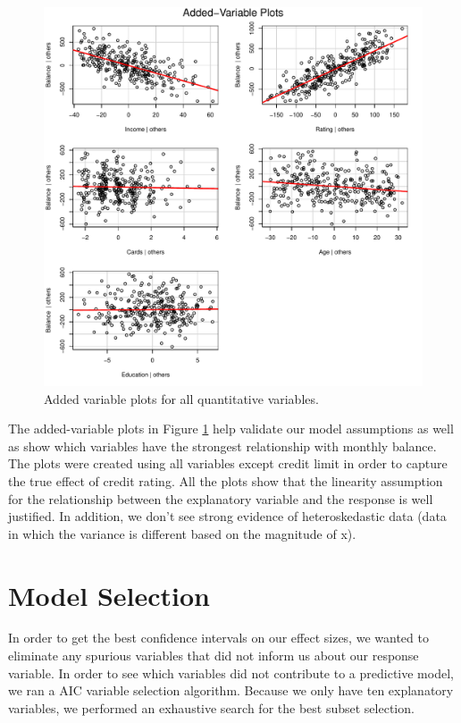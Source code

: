 \documentclass{article}
\begin{document}
\begin{figure}
\centering
\includegraphics[scale=.5]{AVPlot.pdf}
\caption{Added variable plots for all quantitative variables. }
\label{av}
\end{figure}

The added-variable plots in Figure \ref{av} help validate our model assumptions as well as show which variables have the strongest relationship with monthly balance. The plots were created using all variables except credit limit in order to capture the true effect of credit rating. All the plots show that the linearity assumption for the relationship between the explanatory variable and the response is well justified. In addition, we don't see strong evidence of heteroskedastic data (data in which the variance is different based on the magnitude of x).  
\section{Model Selection}
In order to get the best confidence intervals on our effect sizes, we wanted to eliminate any spurious variables that did not inform us about our response variable. In order to see which variables did not contribute to a predictive model, we ran a AIC variable selection algorithm. Because we only have ten explanatory variables, we performed an exhaustive search for the best subset selection. 
\end{document}
